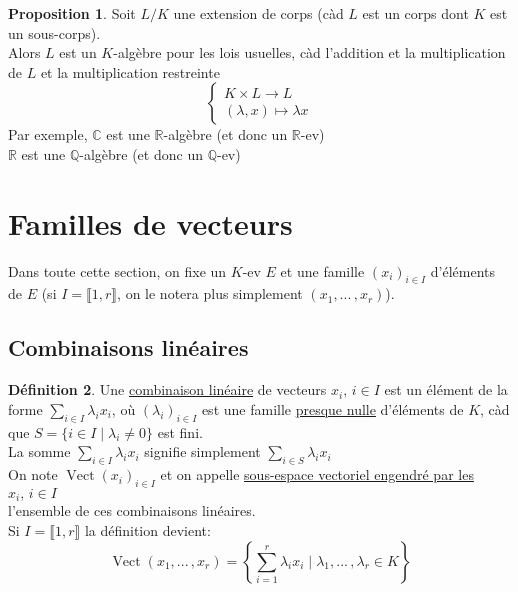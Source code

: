 \documentclass[10pt,a4paper]{article}
\theoremstyle{definition}
\newtheorem{proposition}{Proposition}[section]
\newtheorem{definition}[proposition]{Définition}
\DeclareMathOperator{\vect}{Vect}
\begin{document}
\begin{proposition}
Soit $L / K$ une extension de corps (càd  $L$ est un corps dont $K$ est un sous-corps). \\
Alors $L$ est un $K$-algèbre pour les lois usuelles, càd l'addition et la multiplication de $L$ et la multiplication restreinte
\[\begin{cases}
K \times L \to L \\
(\lambda, x) \mapsto \lambda x
\end{cases}\]
Par exemple, $\mathbb{C}$ est une $\mathbb{R}$-algèbre (et donc un $\mathbb{R}$-ev) \\
\phantom{Par exemple,} $\mathbb{R}$ est une $\mathbb{Q}$-algèbre (et donc un $\mathbb{Q}$-ev) 
\end{proposition}

\section{Familles de vecteurs}
Dans toute cette section, on fixe un $K$-ev $E$ et une famille $(x_i)_{i \in I}$ d'éléments de $E$ (si $I = \llbracket 1, r \rrbracket$, on le notera plus simplement $(x_1, ...\, , x_r)$).
\subsection{Combinaisons linéaires}
\begin{definition}
Une \uline{combinaison linéaire} de vecteurs $x_i,\, i\in I$ est un élément de la forme $\sum\limits_{i \in I} \lambda_i x_i$, où $(\lambda_i)_{i \in I}$ est une famille \uline{presque nulle} d'éléments de $K$, càd que $S = \{ i \in I \mid \lambda_i \neq 0\}$ est fini. \\
La somme $\sum\limits_{i \in I} \lambda_i x_i$ signifie simplement $\sum\limits_{i \in S} \lambda_i x_i$ \\
On note $\vect(x_i)_{i \in I}$ et on appelle \uline{sous-espace vectoriel engendré par les $x_i,\, i \in I$} \\
l'ensemble de ces combinaisons linéaires. \\
Si $I = \llbracket 1, r \rrbracket$ la définition devient:
\[\vect(x_1, ...\, , x_r) = \left\lbrace\sum_{i = 1}^r \lambda_i x_i \mid \lambda_1, ...\, , \lambda_r \in K \right\rbrace\]
\end{definition}
\end{document}
